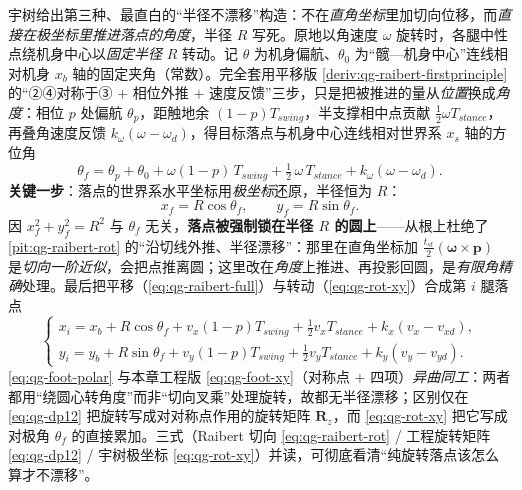 \begin{derivation}\label{deriv:qg-rot-polar}
宇树给出第三种、最直白的“半径不漂移”构造\cite{unitree2023quadruped}：不在\emph{直角坐标}里加切向位移，而\emph{直接在极坐标里推进落点的角度}，半径 $R$ 写死。原地以角速度 $\omega$ 旋转时，各腿中性点绕机身中心以\emph{固定半径} $R$ 转动。记 $\theta$ 为机身偏航、$\theta_0$ 为“髋—机身中心”连线相对机身 $x_b$ 轴的固定夹角（常数）。完全套用平移版 \cref{deriv:qg-raibert-firstprinciple} 的“②④对称于③ $+$ 相位外推 $+$ 速度反馈”三步，只是把被推进的量从\emph{位置}换成\emph{角度}：相位 $p$ 处偏航 $\theta_p$，距触地余 $(1-p)T_{swing}$，半支撑相中点贡献 $\tfrac12\omega T_{stance}$，再叠角速度反馈 $k_\omega(\omega-\omega_d)$，得目标落点与机身中心连线相对世界系 $x_s$ 轴的方位角
\begin{equation}
  \theta_f=\theta_p+\theta_0+\omega(1-p)\,T_{swing}+\tfrac12\,\omega\,T_{stance}+k_\omega(\omega-\omega_d).
  \label{eq:qg-rot-thetaf}
\end{equation}
\textbf{关键一步}：落点的世界系水平坐标用\emph{极坐标}还原，半径恒为 $R$：
\begin{equation}
  x_f=R\cos\theta_f,\qquad y_f=R\sin\theta_f.
  \label{eq:qg-rot-xy}
\end{equation}
因 $x_f^2+y_f^2=R^2$ 与 $\theta_f$ 无关，\textbf{落点被强制锁在半径 $R$ 的圆上}——从根上杜绝了 \cref{pit:qg-raibert-rot} 的“沿切线外推、半径漂移”：那里在直角坐标加 $\tfrac{t_{st}}{2}(\boldsymbol{\omega}\times\mathbf{p})$ 是\emph{切向一阶近似}，会把点推离圆；这里改在\emph{角度}上推进、再投影回圆，是\emph{有限角精确}处理。最后把平移（\cref{eq:qg-raibert-full}）与转动（\cref{eq:qg-rot-xy}）合成第 $i$ 腿落点
\begin{equation}
  \begin{cases}
  x_i=x_b+R\cos\theta_f+v_x(1-p)T_{swing}+\tfrac12 v_x T_{stance}+k_x(v_x-v_{xd}),\\
  y_i=y_b+R\sin\theta_f+v_y(1-p)T_{swing}+\tfrac12 v_y T_{stance}+k_y(v_y-v_{yd}).
  \end{cases}
  \label{eq:qg-foot-polar}
\end{equation}
\cref{eq:qg-foot-polar} 与本章工程版 \cref{eq:qg-foot-xy}（对称点 $+$ 四项）\emph{异曲同工}：两者都用“绕圆心转角度”而非“切向叉乘”处理旋转，故都无半径漂移；区别仅在 \cref{eq:qg-dp12} 把旋转写成对对称点作用的旋转矩阵 $\mathbf{R}_z$，而 \cref{eq:qg-rot-xy} 把它写成对极角 $\theta_f$ 的直接累加。三式（Raibert 切向 \cref{eq:qg-raibert-rot} / 工程旋转矩阵 \cref{eq:qg-dp12} / 宇树极坐标 \cref{eq:qg-rot-xy}）并读，可彻底看清“纯旋转落点该怎么算才不漂移”。
\end{derivation}

